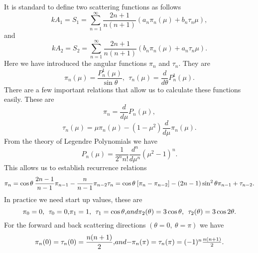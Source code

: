 \documentclass[12pt]{article}
\begin{document}
It is standard to define two scattering functions as follows
\begin{equation}
k A_1=S_1=\sum_{n=1}^{\infty} \frac{2n+1}{n(n+1)} (a_n \pi_n(\mu) 
+b_n \tau_n{\mu}),
\end{equation}
and
\begin{equation}
k A_2=S_2=\sum_{n=1}^{\infty} \frac{2n+1}{n(n+1)} (b_n \pi_n(\mu) 
+a_n \tau_n{\mu}).
\end{equation}
Here we have introduced the angular functions $\pi_n$ and $\tau_n$.
They are 
\begin{equation}
\pi_n(\mu)=\frac{P^1_n (\mu)}{\sin \theta}, \> \> \tau_n(\mu)=\frac{d}{d \theta} P^1_n(\mu).
\end{equation}
There are a few important relations that allow us to calculate these functions easily. These are
\begin{equation}
\pi_n=\frac{d}{d \mu} P_n(\mu),
\end{equation}
\begin{equation}
\tau_n(\mu)=\mu \pi_n(\mu)-(1-\mu^2) \frac{d}{d \mu} \pi_n(\mu).
\end{equation}
From the theory of Legendre Polynomials \cite{AbramowitzStegun:Miebib} we have
\begin{equation}
P_n(\mu)=\frac{1}{2^n n!} \frac{d^n}{d \mu^n} (\mu^2-1)^n.
\end{equation}
This allows us to establish recurrence relations
\begin{equation}
\pi_n=\cos \theta  \> \frac{2n-1}{n-1}\pi_{n-1}- \frac{n}{n-1} \pi_{n-2}
$$   $$
\tau_n= \cos \theta \> [ \pi_n-\pi_{n-2}]-(2n-1) \sin^2 \theta \pi_{n-1}+\tau_{n-2}.
\end{equation}
In practice we need start up values, these are
\begin{equation}
\pi_0=0, \> \> \tau_0=0,
$$    $$
\pi_1=1, \> \> \tau_1=\cos \theta,
$$ and $$
\pi_2(\theta)=3 \cos \theta, \> \> \tau_2( \theta)= 3 \cos 2 \theta.
\end{equation}
For the forward and back scattering directions $(\theta=0, \> \theta=\pi)$ we have
\begin{equation}
\pi_n(0)=\tau_n(0)=\frac{n (n+1)}{2},
$$ and $$
-\pi_n(\pi)=\tau_n(\pi)=(-1)^n \frac{n (n+1)}{2}.
\end{equation}
\end{document}
